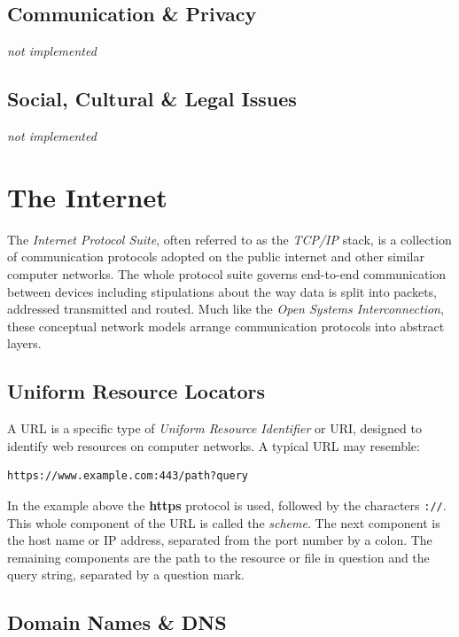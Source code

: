 \documentclass[9pt]{article}
\let\oldsection\section
\renewcommand\section{\clearpage\oldsection}
\begin{document}
\subsection{Communication \& Privacy}
\label{sec:org45820f1}

\emph{not implemented}

\subsection{Social, Cultural \& Legal Issues}
\label{sec:orgc73563d}

\emph{not implemented}

\section{The Internet}
\label{sec:org6507fe6}


The \emph{Internet Protocol Suite}, often referred to as the \emph{TCP/IP} stack, is a collection of communication protocols adopted on the public internet and other similar computer networks. The whole protocol suite governs end-to-end communication between devices including stipulations about the way data is split into packets, addressed transmitted and routed. Much like the \emph{Open Systems Interconnection}, these conceptual network models arrange communication protocols into abstract layers.

\subsection{Uniform Resource Locators}
\label{sec:org795772f}

A URL is a specific type of \emph{Uniform Resource Identifier} or URI, designed to identify web resources on computer networks. A typical URL may resemble:

\begin{verbatim}
https://www.example.com:443/path?query
\end{verbatim}

In the example above the \textbf{https} protocol is used, followed by the characters \texttt{://}. This whole component of the URL is called the \emph{scheme}. The next component is the host name or IP address, separated from the port number by a colon. The remaining components are the path to the resource or file in question and the query string, separated by a question mark.

\subsection{Domain Names \& DNS}
\label{sec:org0dd89b5}
\end{document}
